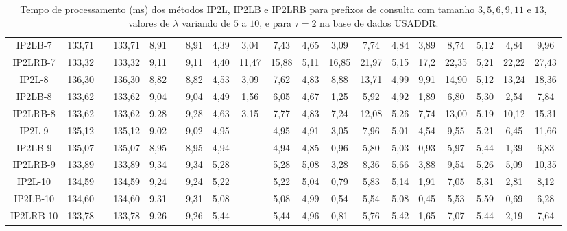 \begin{table}[h]
{\begin{tabular}{c|ccc|ccc|ccc|ccc|ccc|ccc|}
\multicolumn{1}{|c|}{IP2LB-7} & 133,71 &  & 133,71 & 8,91 &  & 8,91 & 4,39 & 3,04 & 7,43 & 4,65 & 3,09 & 7,74 & 4,84 & 3,89 & 8,74 & 5,12 & 4,84 & 9,96 \\
\multicolumn{1}{|c|}{IP2LRB-7} & 133,32 &  & 133,32 & 9,11 &  & 9,11 & 4,40 & 11,47 & 15,88 & 5,11 & 16,85 & 21,97 & 5,15 & 17,2 & 22,35 & 5,21 & 22,22 & 27,43 \\ \hline
\multicolumn{1}{|c|}{IP2L-8} & 136,30 &  & 136,30 & 8,82 &  & 8,82 & 4,53 & 3,09 & 7,62 & 4,83 & 8,88 & 13,71 & 4,99 & 9,91 & 14,90 & 5,12 & 13,24 & 18,36 \\
\multicolumn{1}{|c|}{IP2LB-8} & 133,62 &  & 133,62 & 9,04 &  & 9,04 & 4,49 & 1,56 & 6,05 & 4,67 & 1,25 & 5,92 & 4,92 & 1,89 & 6,80 & 5,30 & 2,54 & 7,84 \\
\multicolumn{1}{|c|}{IP2LRB-8} & 133,62 &  & 133,62 & 9,28 &  & 9,28 & 4,63 & 3,15 & 7,77 & 4,83 & 7,24 & 12,08 & 5,26 & 7,74 & 13,00 & 5,19 & 10,12 & 15,31 \\ \hline
\multicolumn{1}{|c|}{IP2L-9} & 135,12 &  & 135,12 & 9,02 &  & 9,02 & 4,95 &  & 4,95 & 4,91 & 3,05 & 7,96 & 5,01 & 4,54 & 9,55 & 5,21 & 6,45 & 11,66 \\
\multicolumn{1}{|c|}{IP2LB-9} & 135,07 &  & 135,07 & 8,95 &  & 8,95 & 4,94 &  & 4,94 & 4,85 & 0,96 & 5,80 & 5,03 & 0,93 & 5,97 & 5,44 & 1,39 & 6,83 \\
\multicolumn{1}{|c|}{IP2LRB-9} & 133,89 &  & 133,89 & 9,34 &  & 9,34 & 5,28 &  & 5,28 & 5,08 & 3,28 & 8,36 & 5,66 & 3,88 & 9,54 & 5,26 & 5,09 & 10,35 \\ \hline
\multicolumn{1}{|c|}{IP2L-10} & 134,59 &  & 134,59 & 9,24 &  & 9,24 & 5,22 &  & 5,22 & 5,04 & 0,79 & 5,83 & 5,14 & 1,91 & 7,05 & 5,31 & 2,81 & 8,12 \\
\multicolumn{1}{|c|}{IP2LB-10} & 134,60 &  & 134,60 & 9,31 &  & 9,31 & 5,08 &  & 5,08 & 4,99 & 0,54 & 5,54 & 5,08 & 0,45 & 5,53 & 5,59 & 0,69 & 6,28 \\
\multicolumn{1}{|c|}{IP2LRB-10} & 133,78 &  & 133,78 & 9,26 &  & 9,26 & 5,44 &  & 5,44 & 4,96 & 0,81 & 5,76 & 5,42 & 1,65 & 7,07 & 5,44 & 2,19 & 7,64 \\ \hline
\end{tabular}%
}
\caption{Tempo de processamento (ms) dos métodos IP2L, IP2LB e IP2LRB para prefixos de consulta com tamanho $3,5,6,9,11$ e $13$, valores de $\lambda$ variando de $5$ a $10$, e para $\tau=2$ na base de dados USADDR.}
\label{tab:methods-processing-time-tau-2-USADDR}
\end{table}

